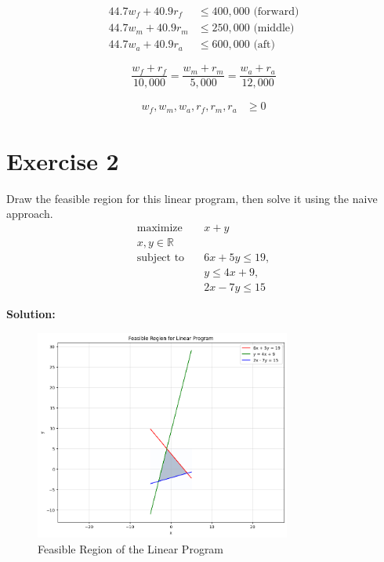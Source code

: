 \documentclass{article}
\begin{document}
\begin{align*}
44.7w_f + 40.9r_f &\leq 400,000 \text{ (forward)} \\
44.7w_m + 40.9r_m &\leq 250,000 \text{ (middle)} \\
44.7w_a + 40.9r_a &\leq 600,000 \text{ (aft)}
\end{align*}

$$
\frac{w_f + r_f}{10,000} = \frac{w_m + r_m}{5,000} = \frac{w_a + r_a}{12,000}
$$

\begin{align*}
w_f, w_m, w_a, r_f, r_m, r_a &\geq 0
\end{align*}

\newpage

\section*{Exercise 2}
Draw the feasible region for this linear program, then solve it using the naive approach.
\begin{align*}
\text{maximize} \quad & x + y \\
x,y \in \mathbb{R} \\
\text{subject to} \quad & 6x + 5y \leq 19, \\
& y \leq 4x + 9, \\
& 2x - 7y \leq 15
\end{align*}

\textbf{Solution: }

\begin{figure}[h]
    \centering
    \includegraphics[width=0.75\textwidth]{plot.png}
    \caption{Feasible Region of the Linear Program}
    \label{fig:feasible_region}
\end{figure}
\end{document}
